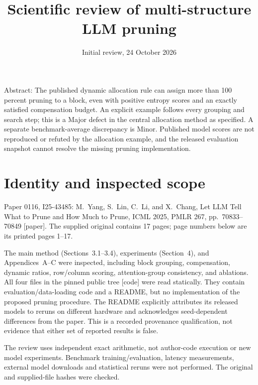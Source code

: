 \documentclass[10pt]{article}
\title{Scientific review of multi-structure LLM pruning}
\author{}
\date{Initial review, 24 October 2026}
\begin{document}
\maketitle
Abstract: The published dynamic allocation rule can assign more than 100 percent pruning to a block, even with positive entropy scores and an exactly satisfied compensation budget. An explicit example follows every grouping and search step; this is a Major defect in the central allocation method as specified. A separate benchmark-average discrepancy is Minor. Published model scores are not reproduced or refuted by the allocation example, and the released evaluation snapshot cannot resolve the missing pruning implementation.\par
\section*{Identity and inspected scope}
Paper 0116, I25-43485: M. Yang, S. Lin, C. Li, and X. Chang, Let LLM Tell What to Prune and How Much to Prune, ICML 2025, PMLR 267, pp. 70833–70849 [paper]. The supplied original contains 17 pages; page numbers below are its printed pages 1–17.\par
The main method (Sections 3.1–3.4), experiments (Section 4), and Appendices A–C were inspected, including block grouping, compensation, dynamic ratios, row/column scoring, attention-group consistency, and ablations. All four files in the pinned public tree [code] were read statically. They contain evaluation/data-loading code and a README, but no implementation of the proposed pruning procedure. The README explicitly attributes its released models to reruns on different hardware and acknowledges seed-dependent differences from the paper. This is a recorded provenance qualification, not evidence that either set of reported results is false.\par
The review uses independent exact arithmetic, not author-code execution or new model experiments. Benchmark training/evaluation, latency measurements, external model downloads and statistical reruns were not performed. The original and supplied-file hashes were checked.\par
\end{document}
